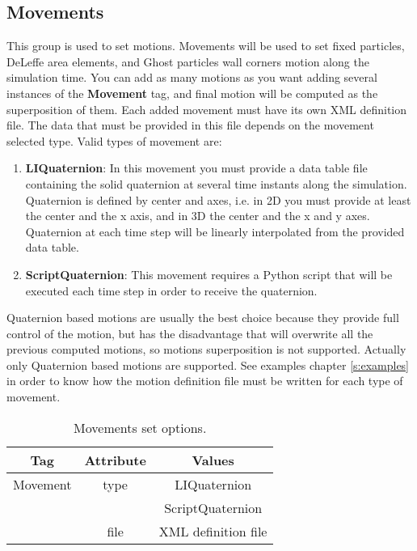 \subsection{Movements}
\label{sss:XML:Movements}
%
This group is used to set motions. Movements will be used to set fixed
particles, DeLeffe area elements, and Ghost particles wall corners motion
along the simulation time. You can add as many motions as you want adding
several instances of the \textbf{Movement} tag, and final motion will be
computed as the superposition of them. \rc
%
Each added movement must have its own XML definition file. The data that
must be provided in this file depends on the movement selected type.
Valid types of movement are:
%
\begin{enumerate}
	\item \textbf{LIQuaternion}: In this movement you must provide a data
	table file containing the solid quaternion at several time instants
	along the simulation. Quaternion is defined by center and axes, i.e.
	in 2D you must provide at least the center and the x axis, and in 3D
	the center and the x and y axes. Quaternion at each time step will be
	linearly interpolated from the provided data table.
	\item \textbf{ScriptQuaternion}: This movement requires a Python script
	that will be executed each time step in order to receive the quaternion.
\end{enumerate}
%
Quaternion based motions are usually the best choice because they provide
full control of the motion, but has the disadvantage that will overwrite
all the previous computed motions, so motions superposition is not supported.\rc
%
Actually only Quaternion based motions are supported.\rc
%
See examples chapter \ref{s:examples} in order to know how the motion definition
file must be written for each type of movement.
%
\begin{table}[h!b!p!]\small
	\centering
	\begin{tabular}{| c | c | c | }
		\hline
		\cellcolor[rgb]{0.7,0.7,0.7}Tag & \cellcolor[rgb]{0.7,0.7,0.7}Attribute & \cellcolor[rgb]{0.7,0.7,0.7}Values \\
		\hline
		Movement & type & LIQuaternion \\
		\hline
		         &      & ScriptQuaternion \\
		\hline
		         & file & XML definition file \\
		\hline
	\end{tabular}
	\caption{Movements set options.}
	\label{tables:caseSetup:Movements:Options}
\end{table}
%
